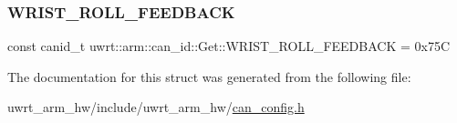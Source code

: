 \subsubsection{\texorpdfstring{W\+R\+I\+S\+T\+\_\+\+R\+O\+L\+L\+\_\+\+F\+E\+E\+D\+B\+A\+CK}{WRIST\_ROLL\_FEEDBACK}}
{\footnotesize\ttfamily const canid\+\_\+t uwrt\+::arm\+::can\+\_\+id\+::\+Get\+::\+W\+R\+I\+S\+T\+\_\+\+R\+O\+L\+L\+\_\+\+F\+E\+E\+D\+B\+A\+CK = 0x75C\hspace{0.3cm}{\ttfamily [static]}}



The documentation for this struct was generated from the following file\+:\begin{DoxyCompactItemize}
\item 
uwrt\+\_\+arm\+\_\+hw/include/uwrt\+\_\+arm\+\_\+hw/\hyperlink{can__config_8h}{can\+\_\+config.\+h}\end{DoxyCompactItemize}
